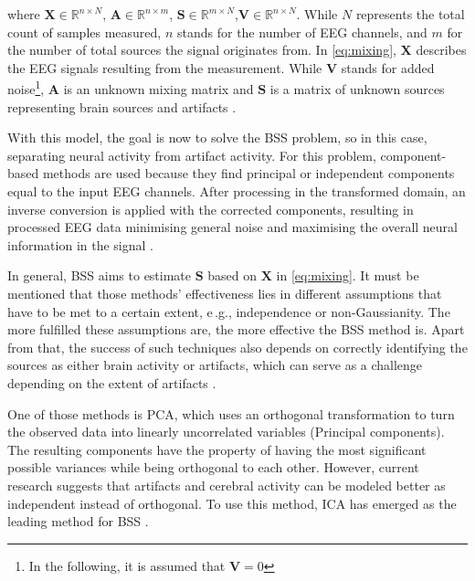       where $\mathbf{X} \in \mathbb{R}^{n \times N}$, $\mathbf{A} \in \mathbb{R}^{n \times m}$, $\mathbf{S} \in \mathbb{R}^{m \times N}$,$\mathbf{V} \in \mathbb{R}^{n \times N}$. While $N$ represents the total count of samples measured, $n$ stands for the number of \ac{EEG} channels, and $m$ for the number of total sources the signal originates from. In \autoref{eq:mixing}, $\mathbf{X}$ describes the \ac{EEG} signals resulting from the measurement. While $\mathbf{V}$ stands for added noise\footnote{In the following, it is assumed that $\mathbf{V} = 0$}, $\mathbf{A}$ is an unknown mixing matrix and $\mathbf{S}$ is a matrix of unknown sources representing brain sources and artifacts \cite{Uriguen_2015}. \par
      With this model, the goal is now to solve the \ac{BSS} problem, so in this case, separating neural activity from artifact activity. For this problem, component-based methods are used because they find principal or independent components equal to the input \ac{EEG} channels. After processing in the transformed domain, an inverse conversion is applied with the corrected components, resulting in processed \ac{EEG} data minimising general noise and maximising the overall neural information in the signal \cite{Uriguen_2015}. \par
      In general, \ac{BSS} aims to estimate $\mathbf{S}$ based on $\mathbf{X}$ in \autoref{eq:mixing}. It must be mentioned that those methods' effectiveness lies in different assumptions that have to be met to a certain extent, e\,.g., independence or non-Gaussianity. The more fulfilled these assumptions are, the more effective the \ac{BSS} method is. Apart from that, the success of such techniques also depends on correctly identifying the sources as either brain activity or artifacts, which can serve as a challenge depending on the extent of artifacts \cite{Uriguen_2015}. \par
      One of those methods is \ac{PCA}, which uses an orthogonal transformation to turn the observed data into linearly uncorrelated variables (Principal components). The resulting components have the property of having the most significant possible variances while being orthogonal to each other. However, current research suggests that artifacts and cerebral activity can be modeled better as independent instead of orthogonal. To use this method, \ac{ICA} has emerged as the leading method for \ac{BSS} \cite{Uriguen_2015}. \par
